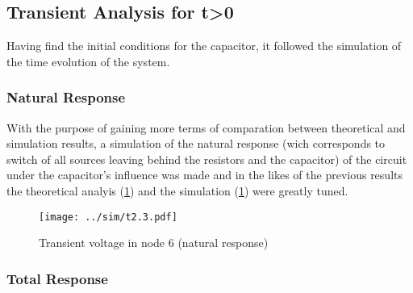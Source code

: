 \begin{table}[h]
  \centering
 \caption{Simulation results. A variable preceded by @ is of type {\em current}
   and expressed in Ampere; other variables are of type {\it voltage} and expressed in
   Volt.}
  \label{tab:op2}
\end{table}






\subsection{Transient Analysis for t>0}

Having find the initial conditions for the capacitor, it followed the simulation of the time evolution of the system.

\subsubsection{Natural Response}

With the purpose of gaining more terms of comparation between theoretical and simulation results, a simulation of the natural response (wich corresponds to switch of all sources leaving behind the resistors and the capacitor) of the circuit under the capacitor's influence was made and in the likes of the previous results the theoretical analyis (\ref{fig:trans1}) and the simulation (\ref{fig:trans1}) were greatly tuned.

\begin{figure}[h] \centering
\texttt{[image: ../sim/t2.3.pdf]}
\caption{Transient voltage in node 6 (natural response)}
\label{fig:trans1}
\end{figure}

\subsubsection{Total Response}

